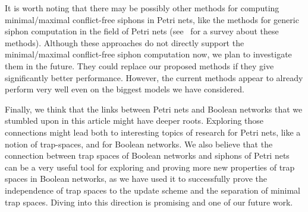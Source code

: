 \documentclass[preprint,12pt]{elsarticle}
\begin{document}
It is worth noting that there may be possibly other methods for computing minimal/maximal conflict-free siphons in Petri nets, like the methods for generic siphon computation in the field of Petri nets (see~\cite{DBLP:journals/isci/LiuB16} for a survey about these methods).
Although these approaches do not directly support the minimal/maximal conflict-free siphon computation now, we plan to investigate them in the future.
They could replace our proposed methods if they give significantly better performance.
However, the current methods appear to already perform very well even on the biggest models we have considered.

Finally, we think that the links between Petri nets and Boolean networks that we stumbled upon in this article might have deeper roots.
Exploring those connections might lead both to interesting topics of research for Petri nets, like a notion of trap-spaces, and for Boolean networks.
We also believe that the connection between trap spaces of Boolean networks and siphons of Petri nets can be a very useful tool for exploring and proving more new properties of trap spaces in Boolean networks, as we have used it to successfully prove the independence of trap spaces to the update scheme and the separation of minimal trap spaces.
Diving into this direction is promising and one of our future work.




\end{document}
